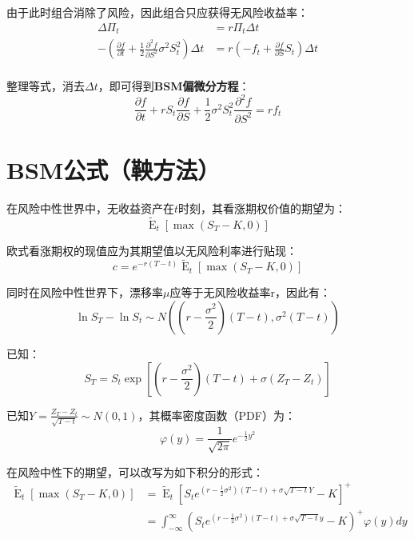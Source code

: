 \documentclass[11pt]{article}
\newcommand{\E}{\operatorname{E}}
\begin{document}
由于此时组合消除了风险，因此组合只应获得无风险收益率：
\begin{align*}
    \Delta \Pi_t & = r \Pi_t \Delta t \\
    -\left( \frac{\partial f}{\partial t} + \frac{1}{2}\frac{\partial^2 f}{\partial S^2} \sigma^2 S_t^2 \right) \Delta t & =  r \left( -f_t + \frac{\partial f}{\partial S} S_t \right) \Delta t \\
\end{align*}

整理等式，消去$\Delta t$，即可得到\textbf{BSM偏微分方程}：
\begin{equation*}
    \frac{\partial f}{\partial t} + r S_t \frac{\partial f}{\partial S} + \frac{1}{2} \sigma^2 S_t^2 \frac{\partial^2 f}{\partial S^2} = r f_t
\end{equation*}

\section{BSM公式（鞅方法）}

在风险中性世界中，无收益资产在$t$时刻，其看涨期权价值的期望为：
\begin{equation*}
    \tilde{\E}_t \left[ \max(S_T-K,0) \right]
\end{equation*}

欧式看涨期权的现值应为其期望值以无风险利率进行贴现：
\begin{equation*}
    c = e^{-r(T-t)} \tilde{\E}_t \left[ \max(S_T-K,0) \right]
\end{equation*}

同时在风险中性世界下，漂移率$\mu$应等于无风险收益率r，因此有：
\begin{equation*}
    \ln S_T - \ln S_t \sim N \left((r-\frac{\sigma^2}{2})(T-t), \sigma^2(T-t)\right)
\end{equation*}

已知：
\begin{equation*}
    S_T = S_t \exp\left[\left(r-\frac{\sigma^2}{2}\right)\left(T-t\right) + \sigma\left(Z_T - Z_t \right)\right]
\end{equation*}

已知$Y = \frac{Z_T - Z_t}{\sqrt{T-t}} \sim N(0,1)$，其概率密度函数（PDF）为：
\begin{equation*}
    \varphi(y) = \frac{1}{\sqrt{2\pi}} e^{-\frac{1}{2}y^2}
\end{equation*}

在风险中性下的期望，可以改写为如下积分的形式：
\begin{align*}
    \tilde{\E}_t \left[ \max(S_T-K,0) \right] & = \tilde{\E}_t \left[ S_t e^{(r-\frac{1}{2}\sigma^2)(T-t) + \sigma\sqrt{T-t}Y} - K \right]^+ \\
    & = \int_{-\infty}^{\infty} \left( S_t e^{(r-\frac{1}{2}\sigma^2)(T-t) + \sigma\sqrt{T-t}y} - K \right)^+ \varphi(y) dy
\end{align*}
\end{document}
